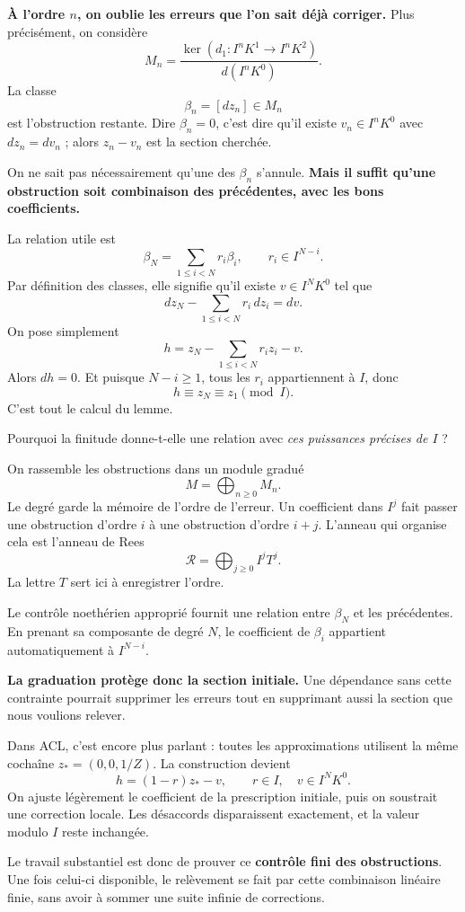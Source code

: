 \documentclass[11pt,a4paper]{article}
\begin{document}
\textbf{À l'ordre $n$, on oublie les erreurs que l'on sait déjà corriger.}
Plus précisément, on considère
\[
 M_n=
 \frac{\ker(d_1:I^nK^1\longrightarrow I^nK^2)}
      {d(I^nK^0)}.
\]
La classe
\[
 \beta_n=[dz_n]\in M_n
\]
est l'obstruction restante. Dire $\beta_n=0$, c'est dire qu'il existe
$v_n\in I^nK^0$ avec $dz_n=dv_n$ ; alors $z_n-v_n$ est la section
cherchée.

On ne sait pas nécessairement qu'une des $\beta_n$ s'annule.
\textbf{Mais il suffit qu'une obstruction soit combinaison des
précédentes, avec les bons coefficients.}

La relation utile est
\[
 \beta_N=\sum_{1\leq i<N}r_i\beta_i,
 \qquad r_i\in I^{N-i}.
\]
Par définition des classes, elle signifie qu'il existe $v\in I^NK^0$
tel que
\[
 dz_N-\sum_{1\leq i<N}r_i\,dz_i=dv.
\]
On pose simplement
\[
 \boxed{h=z_N-\sum_{1\leq i<N}r_i z_i-v.}
\]
Alors $dh=0$. Et puisque $N-i\geq1$, tous les $r_i$ appartiennent à $I$,
donc
\[
 h\equiv z_N\equiv z_1\pmod I.
\]
C'est tout le calcul du lemme.

Pourquoi la finitude donne-t-elle une relation avec \emph{ces puissances
précises de $I$} ?

On rassemble les obstructions dans un module gradué
\[
 M=\bigoplus_{n\geq0}M_n.
\]
Le degré garde la mémoire de l'ordre de l'erreur. Un coefficient dans
$I^j$ fait passer une obstruction d'ordre $i$ à une obstruction d'ordre
$i+j$. L'anneau qui organise cela est l'anneau de Rees
\[
 \mathcal R=\bigoplus_{j\geq0}I^jT^j.
\]
La lettre $T$ sert ici à enregistrer l'ordre.

Le contrôle noethérien approprié fournit une relation entre $\beta_N$
et les précédentes. En prenant sa composante de degré $N$, le
coefficient de $\beta_i$ appartient automatiquement à $I^{N-i}$.

\textbf{La graduation protège donc la section initiale.} Une dépendance
sans cette contrainte pourrait supprimer les erreurs tout en supprimant
aussi la section que nous voulions relever.

Dans ACL, c'est encore plus parlant : toutes les approximations utilisent
la même cochaîne $z_*=(0,0,1/Z)$. La construction devient
\[
 h=(1-r)z_*-v,\qquad r\in I,\quad v\in I^NK^0.
\]
On ajuste légèrement le coefficient de la prescription initiale, puis
on soustrait une correction locale. Les désaccords disparaissent
exactement, et la valeur modulo $I$ reste inchangée.

Le travail substantiel est donc de prouver ce \textbf{contrôle fini des
obstructions}. Une fois celui-ci disponible, le relèvement se fait par
cette combinaison linéaire finie, sans avoir à sommer une suite infinie
de corrections.
\end{document}
